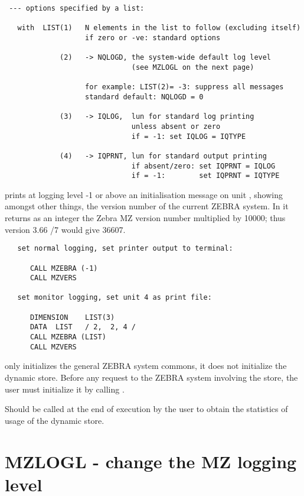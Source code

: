 \begin{verbatim}
 --- options specified by a list:

   with  LIST(1)   N elements in the list to follow (excluding itself)
                   if zero or -ve: standard options

             (2)   -> NQLOGD, the system-wide default log level
                              (see MZLOGL on the next page)

                   for example: LIST(2)= -3: suppress all messages
                   standard default: NQLOGD = 0

             (3)   -> IQLOG,  lun for standard log printing
                              unless absent or zero
                              if = -1: set IQLOG = IQTYPE

             (4)   -> IQPRNT, lun for standard output printing
                              if absent/zero: set IQPRNT = IQLOG
                              if = -1:        set IQPRNT = IQTYPE
\end{verbatim} 


 prints at logging level -1 or above an initialisation message
on unit , showing amongst other things,
the version number of the current ZEBRA system.
In  it returns as an integer
the Zebra MZ version number multiplied by 10000;
thus version 3.66 /7 would give 36607.

\Examples

\begin{verbatim}
   set normal logging, set printer output to terminal:

      CALL MZEBRA (-1)
      CALL MZVERS

   set monitor logging, set unit 4 as print file:

      DIMENSION    LIST(3)
      DATA  LIST   / 2,  2, 4 /
      CALL MZEBRA (LIST)
      CALL MZVERS
\end{verbatim} 

 only initializes the general ZEBRA system commons,
it does not initialize the dynamic store.
Before any request to the ZEBRA system involving the store,
the user must initialize it by calling .


Should be called at the end of execution by the user
to obtain the statistics of usage of the dynamic store.

\section{MZLOGL - change the MZ logging level}

